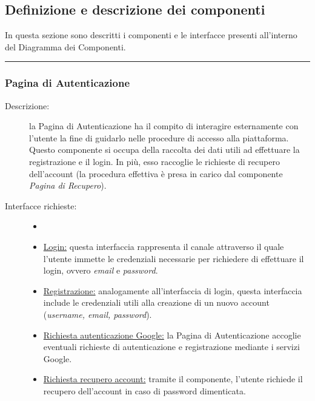 \documentclass[11pt, a4paper]{article}
\theoremstyle{definition} %
\begin{document}
\newpage
\subsection{Definizione e descrizione dei componenti}
In questa sezione sono descritti i componenti e le interfacce presenti
all'interno del Diagramma dei Componenti.

\begin{center}
    \rule{5cm}{1pt}
\end{center}

\subsubsection{Pagina di Autenticazione}

\begin{description}
    \item[Descrizione:] la Pagina di Autenticazione ha il compito
    di interagire esternamente con l'utente la fine di guidarlo nelle
    procedure di accesso alla piattaforma. Questo componente si occupa della
    raccolta dei dati utili ad effettuare la registrazione e il
    login. In più, esso raccoglie le richieste di recupero dell'account
    (la procedura effettiva è presa in carico dal componente
    \textit{Pagina di Recupero}).

    \item[Interfacce richieste:]
    \begin{itemize}
        \item[]

        \item \underline{Login:} questa interfaccia rappresenta
        il canale attraverso il quale l'utente immette le credenziali
        necessarie per richiedere di effettuare il login, ovvero
        \textit{email} e \textit{password}.

        \item \underline{Registrazione:} analogamente all'interfaccia
        di login, questa interfaccia include le credenziali utili alla
        creazione di un nuovo account (\textit{username, email, password}).

        \item \underline{Richiesta autenticazione Google:} la Pagina di
        Autenticazione accoglie eventuali richieste di autenticazione e
        registrazione mediante i servizi Google.

        \item \underline{Richiesta recupero account:} tramite il componente,
        l'utente richiede il recupero dell'account in caso di password
        dimenticata.


\end{itemize}
\end{description}
\end{document}

